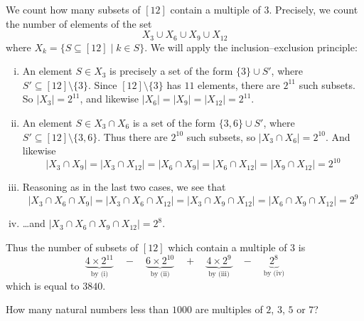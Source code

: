\begin{example}
We count how many subsets of $[12]$ contain a multiple of $3$. Precisely, we count the number of elements of the set
\[ X_3 \cup X_6 \cup X_9 \cup X_{12} \]
where $X_k = \{ S \subseteq [12] \mid k \in S \}$. We will apply the inclusion--exclusion principle:
\begin{enumerate}[(i)]
\item An element $S \in X_3$ is precisely a set of the form $\{ 3 \} \cup S'$, where $S' \subseteq [12] \setminus \{ 3 \}$. Since $[12] \setminus \{ 3 \}$ has $11$ elements, there are $2^{11}$ such subsets. So $|X_3| = 2^{11}$, and likewise $|X_6| = |X_9| = |X_{12}| = 2^{11}$.
\item An element $S \in X_3 \cap X_6$ is a set of the form $\{3,6\} \cup S'$, where $S' \subseteq [12] \setminus \{ 3, 6 \}$. Thus there are $2^{10}$ such subsets, so $|X_3 \cap X_6| = 2^{10}$. And likewise
\[ |X_3 \cap X_9| = |X_3 \cap X_{12}| = |X_6 \cap X_9| = |X_6 \cap X_{12}| = |X_9 \cap X_{12}| = 2^{10} \]
\item Reasoning as in the last two cases, we see that
\[ |X_3 \cap X_6 \cap X_9| = |X_3 \cap X_6 \cap X_{12}| = |X_3 \cap X_9 \cap X_{12}| = |X_6 \cap X_9 \cap X_{12}| = 2^9 \]
\item \dots{}and $|X_3 \cap X_6 \cap X_9 \cap X_{12}| = 2^8$.
\end{enumerate}
Thus the number of subsets of $[12]$ which contain a multiple of $3$ is
\[ \underbrace{4 \times 2^{11}}_{\text{by (i)}} \quad - \quad \underbrace{6 \times 2^{10}}_{\text{by (ii)}}  \quad + \quad \underbrace{4 \times 2^9}_{\text{by (iii)}} \quad - \quad \underbrace{2^8}_{\text{by (iv)}}  \]
which is equal to $3840$.
\end{example}

\begin{exercise}
How many natural numbers less than $1000$ are multiples of $2$, $3$, $5$ or $7$?
\end{exercise}

